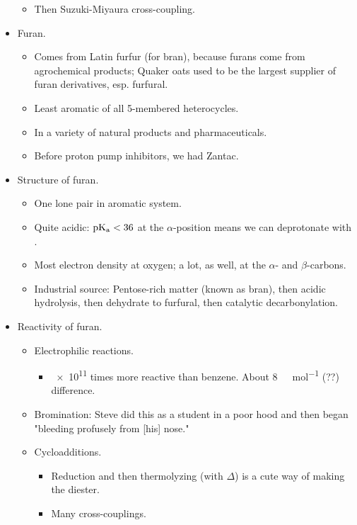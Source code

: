 \documentclass[../notes.tex]{subfiles}
\begin{document}
\begin{itemize}
\begin{itemize}
        \item Then Suzuki-Miyaura cross-coupling.
    \end{itemize}
    \item Furan.
    \begin{itemize}
        \item Comes from Latin furfur (for bran), because furans come from agrochemical products; Quaker oats used to be the largest supplier of furan derivatives, esp. furfural.
        \item Least aromatic of all 5-membered heterocycles.
        \item In a variety of natural products and pharmaceuticals.
        \item Before proton pump inhibitors, we had Zantac.
    \end{itemize}
    \item Structure of furan.
    \begin{itemize}
        \item One lone pair in aromatic system.
        \item Quite acidic: $\operatorname{\text{p}K_\text{a}}<36$ at the $\alpha$-position means we can deprotonate with .
        \item Most electron density at oxygen; a lot, as well, at the $\alpha$- and $\beta$-carbons.
        \item Industrial source: Pentose-rich matter (known as bran), then acidic hydrolysis, then dehydrate to furfural, then catalytic decarbonylation.
    \end{itemize}
    \item Reactivity of furan.
    \begin{itemize}
        \item Electrophilic reactions.
        \begin{itemize}
            \item \num{e11} times more reactive than benzene. About \SI[per-mode=symbol]{8}{\kilo\calorie\per\mole} (??) difference.
        \end{itemize}
        \item Bromination: Steve did this as a student in a poor hood and then began "bleeding profusely from [his] nose."
        \item Cycloadditions.
        \begin{itemize}
            \item Reduction and then thermolyzing (with $\Delta$) is a cute way of making the diester.
            \item Many cross-couplings.

\end{itemize}
\end{itemize}
\end{itemize}
\end{document}
